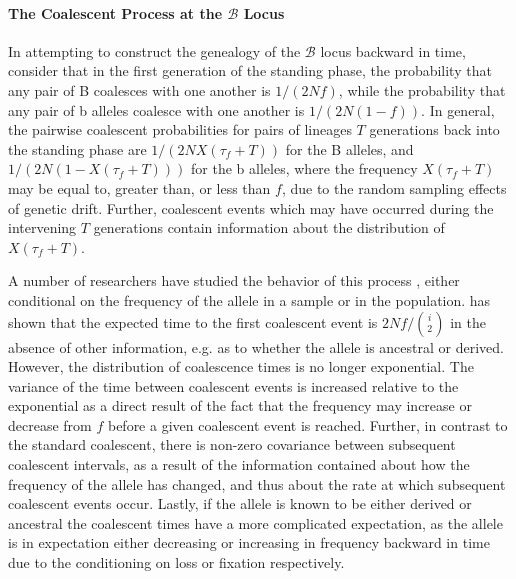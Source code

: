 \documentclass[a4paper,10pt]{article}
\newcommand{\fancyB}{$\mathcal B$ }
\begin{document}
\paragraph{The Coalescent Process at the \fancyB Locus}

In attempting to construct the genealogy of the \fancyB locus backward in time, consider that in the first generation of the standing phase, the probability that any pair of B coalesces with one another is $1/\left(2Nf\right)$, while the probability that any pair of b alleles coalesce with one another is $1/\left(2N\left(1-f\right)\right)$. In general, the pairwise coalescent probabilities for pairs of lineages $T$ generations back into the standing phase are $1/\left(2NX(\tau_{f} + T)\right)$ for the B alleles, and $1/\left(2N\left(1-X\left(\tau_{f}+T\right)\right)\right)$ for the b alleles, where the frequency $X\left(\tau_{f} + T\right)$ may be equal to, greater than, or less than $f$, due to the random sampling effects of genetic drift. Further, coalescent events which may have occurred during the intervening $T$ generations contain information about the distribution of $X\left(\tau_{f} + T\right)$.

A number of researchers have studied the behavior of this process \citep{XXXX}, either conditional on the frequency of the allele in a sample or in the population. \cite{Wiuf:2000js} has shown that the expected time to the first coalescent event is $2 N f/ {i \choose 2}$ in the absence of other information, e.g. as to whether the allele is ancestral or derived. However, the distribution of coalescence times is no longer exponential. The variance of the time between coalescent events is increased relative to the exponential as a direct result of the fact that the frequency may increase or decrease from $f$ before a given coalescent event is reached. Further, in contrast to the standard coalescent, there is non-zero covariance between subsequent coalescent intervals, as a result of the information contained about how the frequency of the allele has changed, and thus about the rate at which subsequent coalescent events occur. Lastly, if the allele is known to be either derived or ancestral the coalescent times have a more complicated expectation, as the allele is in expectation either decreasing or increasing in frequency backward in time due to the conditioning on loss or fixation respectively.

%
%
\end{document}
